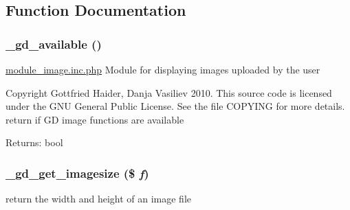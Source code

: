 \subsection{Function Documentation}
\hypertarget{module__image_8inc_8php_574d6d760e50b88ffa815cab30a5e634}{
\subsubsection[{\_\-gd\_\-available}]{\setlength{\rightskip}{0pt plus 5cm}\_\-gd\_\-available ()}}
\label{module__image_8inc_8php_574d6d760e50b88ffa815cab30a5e634}


\hyperlink{module__image_8inc_8php}{module\_\-image.inc.php} Module for displaying images uploaded by the user

Copyright Gottfried Haider, Danja Vasiliev 2010. This source code is licensed under the GNU General Public License. See the file COPYING for more details. return if GD image functions are available

\begin{Desc}
\item[Returns:]bool \end{Desc}
\hypertarget{module__image_8inc_8php_3c76028c34273e722c9691243377a208}{
\subsubsection[{\_\-gd\_\-get\_\-imagesize}]{\setlength{\rightskip}{0pt plus 5cm}\_\-gd\_\-get\_\-imagesize (\$ {\em f})}}
\label{module__image_8inc_8php_3c76028c34273e722c9691243377a208}


return the width and height of an image file

